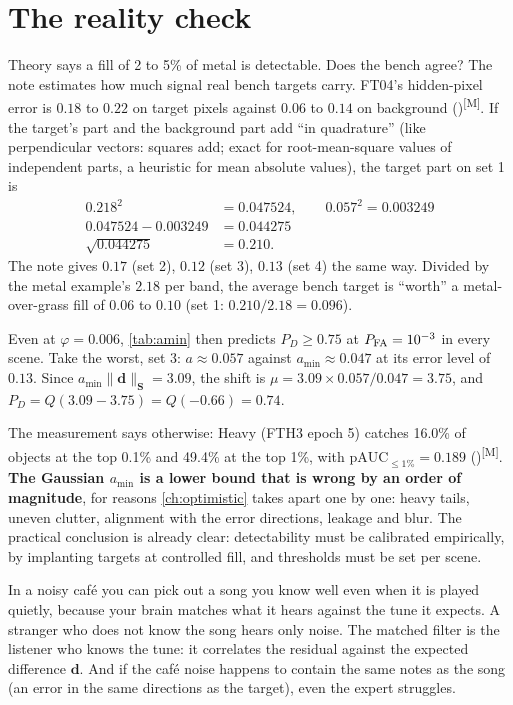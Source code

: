 \documentclass[11pt,a4paper,oneside,openany]{book}
\newcommand{\B}[1]{{\symbf{#1}}}
\newcommand{\B}[1]{{\bm{#1}}}
\newcommand{\meas}{\textsuperscript{\textsf{\scriptsize[M]}}}
\newcommand{\nrm}[1]{\lVert #1\rVert}
\newcommand{\vd}{\B{d}}
\newcommand{\mS}{\B{S}}
\begin{document}
\section{The reality check}

Theory says a fill of 2 to 5\% of metal is detectable. Does the bench agree? The note estimates how much signal real bench targets carry.
FT04's hidden-pixel error is $0.18$ to $0.22$ on target pixels against $0.06$ to $0.14$ on background
()\meas. If the target's part and the background part add ``in quadrature'' (like perpendicular vectors:
squares add; exact for root-mean-square values of independent parts, a heuristic for mean absolute values), the target part on set 1 is
\begin{align*}
0.218^2 &= 0.047524,\qquad 0.057^2=0.003249\\
0.047524-0.003249 &= 0.044275\\
\sqrt{0.044275} &= 0.210 .
\end{align*}
The note gives $0.17$ (set 2), $0.12$ (set 3), $0.13$ (set 4) the same way. Divided by the metal example's $2.18$ per band, the average bench target
is ``worth'' a metal-over-grass fill of $0.06$ to $0.10$ (set 1: $0.210/2.18=0.096$).

Even at $\varphi=0.006$, \cref{tab:amin} then predicts $P_D\ge0.75$ at $P_{\rm FA}=10^{-3}$ in every scene. Take the worst, set 3: $a\approx0.057$
against $a_{\min}\approx0.047$ at its error level of $0.13$. Since $a_{\min}\nrm{\vd}_{\mS}=3.09$, the shift is $\mu=3.09\times0.057/0.047=3.75$, and
$P_D=Q(3.09-3.75)=Q(-0.66)=0.74$.

The measurement says otherwise: Heavy (FTH3 epoch 5) catches 16.0\% of objects at the top 0.1\% and 49.4\% at the top 1\%, with
$\text{pAUC}_{\le1\%}=0.189$ ()\meas. \textbf{The Gaussian $a_{\min}$ is a lower bound that is wrong by an order of
magnitude}, for reasons \cref{ch:optimistic} takes apart one by one: heavy tails, uneven clutter, alignment with the error directions, leakage and
blur. The practical conclusion is already clear: detectability must be calibrated empirically, by implanting targets at controlled fill, and
thresholds must be set per scene.

\begin{analogy}
In a noisy café you can pick out a song you know well even when it is played quietly, because your brain matches what it hears against the
tune it expects. A stranger who does not know the song hears only noise. The matched filter is the listener who knows the tune: it correlates
the residual against the expected difference $\vd$. And if the café noise happens to contain the same notes as the song (an error in the same
directions as the target), even the expert struggles.
\end{analogy}
\end{document}
